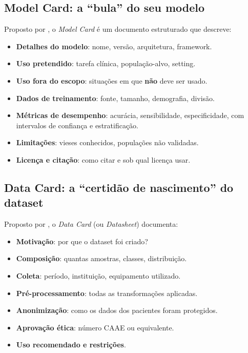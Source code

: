 \subsection{Model Card: a ``bula'' do seu modelo}

Proposto por , o \textit{Model Card} é um
documento estruturado que descreve:

\begin{itemize}
  \item \textbf{Detalhes do modelo}: nome, versão, arquitetura, framework.
  \item \textbf{Uso pretendido}: tarefa clínica, população-alvo, setting.
  \item \textbf{Uso fora do escopo}: situações em que \textbf{não} deve
    ser usado.
  \item \textbf{Dados de treinamento}: fonte, tamanho, demografia, divisão.
  \item \textbf{Métricas de desempenho}: acurácia, sensibilidade,
    especificidade, com intervalos de confiança e estratificação.
  \item \textbf{Limitações}: vieses conhecidos, populações não validadas.
  \item \textbf{Licença e citação}: como citar e sob qual licença usar.
\end{itemize}

\subsection{Data Card: a ``certidão de nascimento'' do dataset}

Proposto por , o \textit{Data Card}
(ou \textit{Datasheet}) documenta:

\begin{itemize}
  \item \textbf{Motivação}: por que o dataset foi criado?
  \item \textbf{Composição}: quantas amostras, classes, distribuição.
  \item \textbf{Coleta}: período, instituição, equipamento utilizado.
  \item \textbf{Pré-processamento}: todas as transformações aplicadas.
  \item \textbf{Anonimização}: como os dados dos pacientes foram protegidos.
  \item \textbf{Aprovação ética}: número CAAE ou equivalente.
  \item \textbf{Uso recomendado e restrições}.
\end{itemize}


